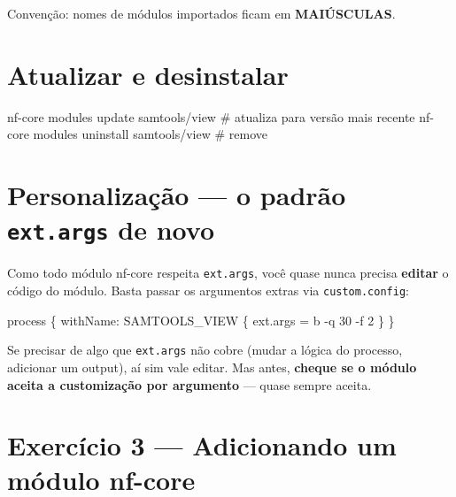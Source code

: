 \documentclass[
  brazilian,
  letterpaper,
  DIV=11,
  numbers=noendperiod]{scrreprt}
\newenvironment{Shaded}{\begin{snugshade}}{\end{snugshade}}
\newcommand{\CommentTok}[1]{\textcolor[rgb]{0.37,0.37,0.37}{#1}}
\newcommand{\ExtensionTok}[1]{\textcolor[rgb]{0.00,0.23,0.31}{#1}}
\newcommand{\NormalTok}[1]{\textcolor[rgb]{0.00,0.23,0.31}{#1}}
\newcommand{\OperatorTok}[1]{\textcolor[rgb]{0.37,0.37,0.37}{#1}}
\newcommand{\StringTok}[1]{\textcolor[rgb]{0.13,0.47,0.30}{#1}}
\begin{document}
Convenção: nomes de módulos importados ficam em \textbf{MAIÚSCULAS}.

\section{Atualizar e desinstalar}\label{atualizar-e-desinstalar}

\begin{Shaded}
\begin{Highlighting}[]
\ExtensionTok{nf{-}core}\NormalTok{ modules update samtools/view     }\CommentTok{\# atualiza para versão mais recente}
\ExtensionTok{nf{-}core}\NormalTok{ modules uninstall samtools/view  }\CommentTok{\# remove}
\end{Highlighting}
\end{Shaded}

\section{\texorpdfstring{Personalização --- o padrão \texttt{ext.args}
de
novo}{Personalização --- o padrão ext.args de novo}}\label{personalizauxe7uxe3o-o-padruxe3o-ext.args-de-novo}

Como todo módulo nf-core respeita \texttt{ext.args}, você quase nunca
precisa \textbf{editar} o código do módulo. Basta passar os argumentos
extras via \texttt{custom.config}:

\begin{Shaded}
\begin{Highlighting}[]
\NormalTok{process }\OperatorTok{\{}
\NormalTok{    withName}\OperatorTok{:} \StringTok{\textquotesingle{}SAMTOOLS\_VIEW\textquotesingle{}} \OperatorTok{\{}
\NormalTok{        ext}\OperatorTok{.}\NormalTok{args }\OperatorTok{=} \StringTok{\textquotesingle{}{-}b {-}q 30 {-}f 2\textquotesingle{}}
    \OperatorTok{\}}
\OperatorTok{\}}
\end{Highlighting}
\end{Shaded}

Se precisar de algo que \texttt{ext.args} não cobre (mudar a lógica do
processo, adicionar um output), aí sim vale editar. Mas antes,
\textbf{cheque se o módulo aceita a customização por argumento} ---
quase sempre aceita.

\section{Exercício 3 --- Adicionando um módulo
nf-core}\label{exercuxedcio-3-adicionando-um-muxf3dulo-nf-core}
\end{document}
